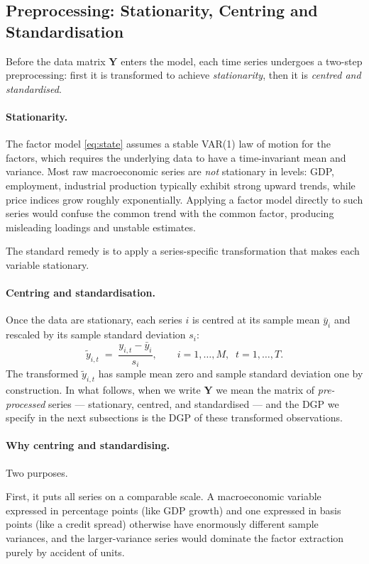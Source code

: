 \documentclass[11pt, a4paper, oneside]{article}
\newcommand{\mY}{\mathbf{Y}}
\begin{document}
\subsection{Preprocessing: Stationarity, Centring and Standardisation}

Before the data matrix $\mY$ enters the model, each time series
undergoes a two-step preprocessing: first it is transformed to
achieve \emph{stationarity}, then it is \emph{centred and standardised}.

\paragraph{Stationarity.}
The factor model \eqref{eq:state} assumes a stable VAR(1) law of motion
for the factors, which requires the underlying data to have a
time-invariant mean and variance. Most raw macroeconomic series are
\emph{not} stationary in levels: GDP, employment, industrial production
typically exhibit strong upward trends, while price indices grow
roughly exponentially. Applying a factor model directly to such series
would confuse the common trend with the common factor, producing
misleading loadings and unstable estimates.

The standard remedy is to apply a series-specific transformation that
makes each variable stationary.

\paragraph{Centring and standardisation.}
Once the data are stationary, each series $i$ is centred at its sample
mean $\bar{y}_i$ and rescaled by its sample standard deviation $s_i$:
\[
\tilde{y}_{i,t} \;=\; \frac{y_{i,t} - \bar{y}_i}{s_i},
\qquad i = 1, \ldots, M, \;\; t = 1, \ldots, T.
\]
The transformed $\tilde{y}_{i,t}$ has sample mean zero and sample
standard deviation one by construction. In what follows, when we write
$\mY$ we mean the matrix of \emph{pre-processed} series —
stationary, centred, and standardised — and the DGP we specify in the
next subsections is the DGP of these transformed observations.

\paragraph{Why centring and standardising.}
Two purposes.

First, it puts all series on a comparable scale. A macroeconomic variable
expressed in percentage points (like GDP growth) and one expressed in
basis points (like a credit spread) otherwise have enormously different
sample variances, and the larger-variance series would dominate the
factor extraction purely by accident of units.
\end{document}

